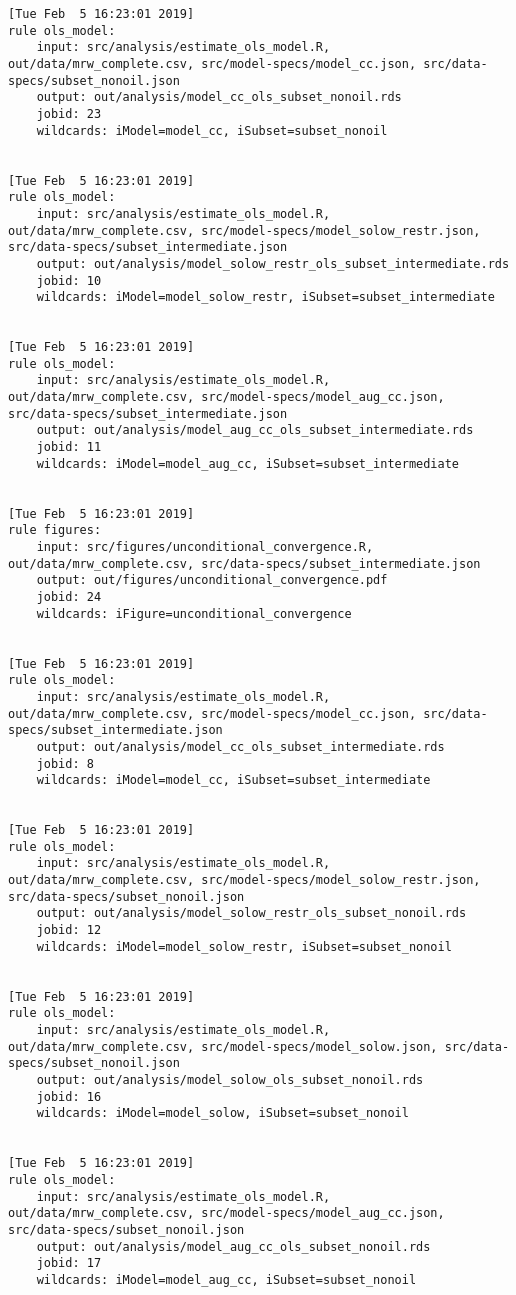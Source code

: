\documentclass[]{book}
\theoremstyle{definition}
\theoremstyle{definition}
\theoremstyle{definition}
\theoremstyle{remark}
\begin{document}
\begin{verbatim}
[Tue Feb  5 16:23:01 2019]
rule ols_model:
    input: src/analysis/estimate_ols_model.R, out/data/mrw_complete.csv, src/model-specs/model_cc.json, src/data-specs/subset_nonoil.json
    output: out/analysis/model_cc_ols_subset_nonoil.rds
    jobid: 23
    wildcards: iModel=model_cc, iSubset=subset_nonoil


[Tue Feb  5 16:23:01 2019]
rule ols_model:
    input: src/analysis/estimate_ols_model.R, out/data/mrw_complete.csv, src/model-specs/model_solow_restr.json, src/data-specs/subset_intermediate.json
    output: out/analysis/model_solow_restr_ols_subset_intermediate.rds
    jobid: 10
    wildcards: iModel=model_solow_restr, iSubset=subset_intermediate


[Tue Feb  5 16:23:01 2019]
rule ols_model:
    input: src/analysis/estimate_ols_model.R, out/data/mrw_complete.csv, src/model-specs/model_aug_cc.json, src/data-specs/subset_intermediate.json
    output: out/analysis/model_aug_cc_ols_subset_intermediate.rds
    jobid: 11
    wildcards: iModel=model_aug_cc, iSubset=subset_intermediate


[Tue Feb  5 16:23:01 2019]
rule figures:
    input: src/figures/unconditional_convergence.R, out/data/mrw_complete.csv, src/data-specs/subset_intermediate.json
    output: out/figures/unconditional_convergence.pdf
    jobid: 24
    wildcards: iFigure=unconditional_convergence


[Tue Feb  5 16:23:01 2019]
rule ols_model:
    input: src/analysis/estimate_ols_model.R, out/data/mrw_complete.csv, src/model-specs/model_cc.json, src/data-specs/subset_intermediate.json
    output: out/analysis/model_cc_ols_subset_intermediate.rds
    jobid: 8
    wildcards: iModel=model_cc, iSubset=subset_intermediate


[Tue Feb  5 16:23:01 2019]
rule ols_model:
    input: src/analysis/estimate_ols_model.R, out/data/mrw_complete.csv, src/model-specs/model_solow_restr.json, src/data-specs/subset_nonoil.json
    output: out/analysis/model_solow_restr_ols_subset_nonoil.rds
    jobid: 12
    wildcards: iModel=model_solow_restr, iSubset=subset_nonoil


[Tue Feb  5 16:23:01 2019]
rule ols_model:
    input: src/analysis/estimate_ols_model.R, out/data/mrw_complete.csv, src/model-specs/model_solow.json, src/data-specs/subset_nonoil.json
    output: out/analysis/model_solow_ols_subset_nonoil.rds
    jobid: 16
    wildcards: iModel=model_solow, iSubset=subset_nonoil


[Tue Feb  5 16:23:01 2019]
rule ols_model:
    input: src/analysis/estimate_ols_model.R, out/data/mrw_complete.csv, src/model-specs/model_aug_cc.json, src/data-specs/subset_nonoil.json
    output: out/analysis/model_aug_cc_ols_subset_nonoil.rds
    jobid: 17
    wildcards: iModel=model_aug_cc, iSubset=subset_nonoil



\end{verbatim}
\end{document}

